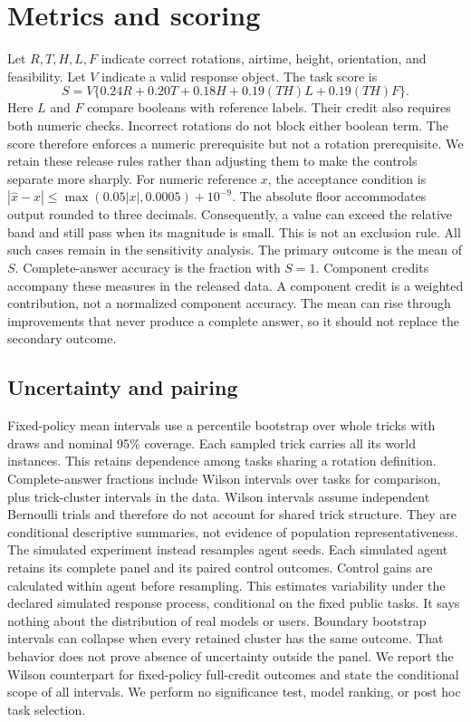 \documentclass{article}
\begin{document}
\section{Metrics and scoring}
Let $R,T,H,L,F$ indicate correct rotations, airtime, height, orientation, and feasibility. Let $V$ indicate a valid response object. The task score is
\[S=V\{0.24R+0.20T+0.18H+0.19(TH)L+0.19(TH)F\}.\]
Here $L$ and $F$ compare booleans with reference labels. Their credit also requires both numeric checks. Incorrect rotations do not block either boolean term. The score therefore enforces a numeric prerequisite but not a rotation prerequisite. We retain these release rules rather than adjusting them to make the controls separate more sharply.
For numeric reference $x$, the acceptance condition is $|\hat{x}-x|\leq\max(0.05|x|,0.0005)+10^{-9}$. The absolute floor accommodates output rounded to three decimals. Consequently, a value can exceed the relative band and still pass when its magnitude is small. This is not an exclusion rule. All such cases remain in the sensitivity analysis.
The primary outcome is the mean of $S$. Complete-answer accuracy is the fraction with $S=1$. Component credits accompany these measures in the released data. A component credit is a weighted contribution, not a normalized component accuracy. The mean can rise through improvements that never produce a complete answer, so it should not replace the secondary outcome.
\subsection{Uncertainty and pairing}
Fixed-policy mean intervals use a percentile bootstrap over whole tricks with \BootstrapDraws{} draws and nominal 95\% coverage. Each sampled trick carries all its world instances. This retains dependence among tasks sharing a rotation definition. Complete-answer fractions include Wilson intervals over tasks for comparison, plus trick-cluster intervals in the data. Wilson intervals assume independent Bernoulli trials and therefore do not account for shared trick structure. They are conditional descriptive summaries, not evidence of population representativeness.
The simulated experiment instead resamples agent seeds. Each simulated agent retains its complete panel and its paired control outcomes. Control gains are calculated within agent before resampling. This estimates variability under the declared simulated response process, conditional on the fixed public tasks. It says nothing about the distribution of real models or users.
Boundary bootstrap intervals can collapse when every retained cluster has the same outcome. That behavior does not prove absence of uncertainty outside the panel. We report the Wilson counterpart for fixed-policy full-credit outcomes and state the conditional scope of all intervals. We perform no significance test, model ranking, or post hoc task selection.
\end{document}
